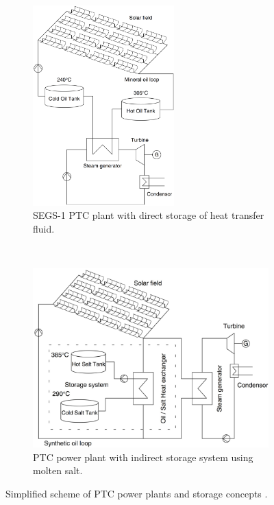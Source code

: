 \begin{figure}[!ht]
        \centering
        \begin{subfigure}[b]{0.5\textwidth}
                \centering
                \includegraphics[width=0.6\textwidth]{FIG/troughdirecttwotank}
                \caption{SEGS-1 PTC plant with direct storage of heat transfer fluid.}\label{troughdirecttwotank}
        \end{subfigure}%
        ~
        \begin{subfigure}[b]{0.5\textwidth}
                \centering
                \includegraphics[width=1\textwidth]{FIG/troughtindirecttwotank}
                \caption{PTC power plant with indirect storage system using molten salt.}\label{troughtindirecttwotank}
        \end{subfigure}
        \caption[Simplified scheme of PTC power plants and storage concepts.]{Simplified scheme of PTC power plants and storage concepts \cite{Steinmann2012}.}\label{storageconceptstrough}
\end{figure}
